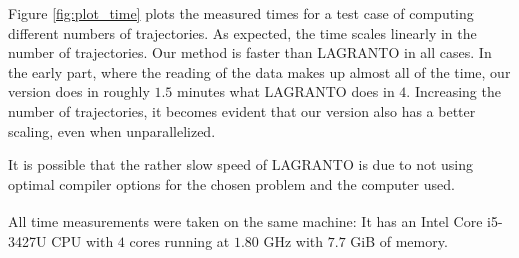Figure \ref{fig:plot_time} plots the measured times for a test case of computing different numbers of trajectories. As expected, the time scales linearly in the number of trajectories. Our method is faster than LAGRANTO in all cases. In the early part, where the reading of the data makes up almost all of the time, our version does in roughly $1.5$ minutes what LAGRANTO does in $4$. Increasing the number of trajectories, it becomes evident that our version also has a better scaling, even when unparallelized.

It is possible that the rather slow speed of LAGRANTO is due to not using optimal compiler options for the chosen problem and the computer used.

All time measurements were taken on the same machine: It has an Intel\textsuperscript{\textregistered} Core\textsuperscript{\texttrademark} i5-3427U CPU with $4$ cores running at $1.80$ GHz with $7.7$ GiB of memory.

